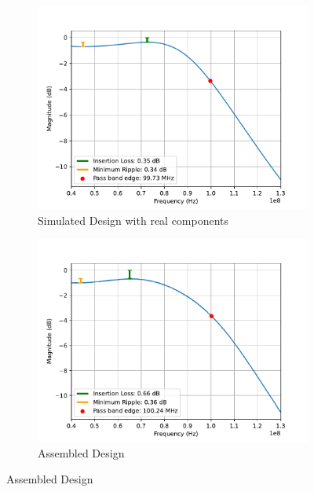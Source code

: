 \documentclass[letterpaper,12pt]{article}
\begin{document}
\begin{figure}[H]
    \medskip
  
    \begin{subfigure}[t]{.49\textwidth}
      \centering
      \includegraphics[width=\linewidth]{figures/4.real}
      \caption{Simulated Design with real components}
    \end{subfigure}
    \hfill
    \begin{subfigure}[t]{.49\textwidth}
      \centering
      \includegraphics[width=\linewidth]{figures/4.assembled}
      \caption{Assembled Design}
    \end{subfigure}
  \end{figure}

\newpage
\end{document}
